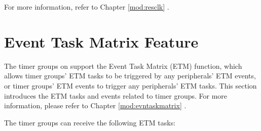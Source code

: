 \documentclass[main\_\_EN.tex]{subfiles}
\begin{document}
For more information, refer to Chapter \ref{mod:resclk} \textit{}.




\section{Event Task Matrix Feature}
\label{sec:timg-etm-func}

The timer groups on \chipname{} support the Event Task Matrix (ETM) function, which allows timer groups' ETM tasks to be triggered by any peripherals' ETM events, or timer groups' ETM events to trigger any peripherals' ETM tasks. This section introduces the ETM tasks and events related to timer groups. For more information, please refer to Chapter \ref{mod:evntaskmatrix} \textit{}.

The timer groups can receive the following ETM tasks:
\end{document}
